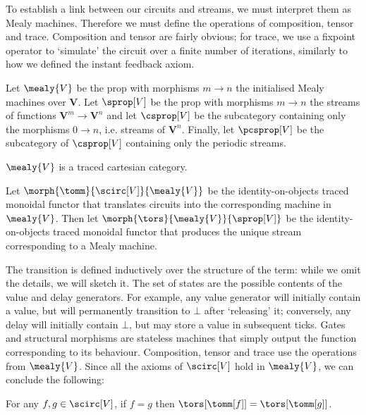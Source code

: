 \documentclass[11pt,numbib]{article}
\begin{document}
To establish a link between our circuits and streams, we must interpret them as Mealy machines.
Therefore we must define the operations of composition, tensor and trace.
Composition and tensor are fairly obvious; for trace, we use a fixpoint operator to `simulate' the circuit over a finite number of iterations, similarly to how we defined the instant feedback axiom.

\begin{definition}
    Let $\mealy{V}$ be the prop with morphisms $m \to n$ the initialised Mealy machines over $\textbf{V}$.
    Let $\sprop[V]$ be the prop with morphisms $m \to n$ the streams of functions $\textbf{V}^m \to \textbf{V}^n$ and let $\csprop[V]$ be the subcategory containing only the morphisms $0 \to n$, i.e. streams of $\textbf{V}^n$.
    Finally, let $\pcsprop[V]$ be the subcategory of $\csprop[V]$ containing only the periodic streams.
\end{definition}

\begin{proposition}
    $\mealy{V}$ is a traced cartesian category.
\end{proposition}

\begin{definition}
    Let $\morph{\tomm}{\scirc[V]}{\mealy{V}}$ be the identity-on-objects traced monoidal functor that translates circuits into the corresponding machine in $\mealy{V}$.
    Then let $\morph{\tors}{\mealy{V}}{\sprop[V]}$ be the identity-on-objects traced monoidal functor that produces the unique stream corresponding to a Mealy machine.
\end{definition}

\noindent
The transition is defined inductively over the structure of the term: while we omit the details, we will sketch it.
The set of states are the possible contents of the value and delay generators.
For example, any value generator will initially contain a value, but will permanently transition to $\bot$ after `releasing' it; conversely, any delay will initially contain $\bot$, but may store a value in subsequent ticks.
Gates and structural morphisms are stateless machines that simply output the function corresponding to its behaviour.
Composition, tensor and trace use the operations from $\mealy{V}$.
Since all the axioms of $\scirc[V]$ hold in $\mealy{V}$, we can conclude the following:

\begin{theorem}
    For any $f,g \in \scirc[V]$, if $f = g$ then $\tors[\tomm[f]] = \tors[\tomm[g]]$.
\end{theorem}
\end{document}
